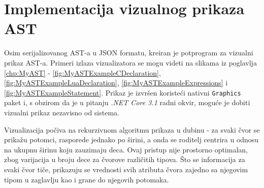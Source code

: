 \section{Implementacija vizualnog prikaza AST}
\label{sec:ImplementationVisualizer}

Osim serijalizovanog AST-a u JSON formatu, kreiran je potprogram za vizualni prikaz AST-a. Primeri izlaza vizualizatora se mogu videti na slikama iz poglavlja \ref{chp:MyAST} - \ref{fig:MyASTExampleCDeclaration}, \ref{fig:MyASTExampleLuaDeclaration}, \ref{fig:MyASTExampleExpressions} i \ref{fig:MyASTExampleStatement}. Prikaz je izvršen koristeći nativni \texttt{Graphics} paket i, s obzirom da je u pitanju \emph{.NET Core 3.1} radni okvir, moguće je dobiti vizualni prikaz nezavisno od sistema.

Vizualizacija počiva na rekurzivnom algoritmu prikaza u dubinu - za svaki čvor se prikažu potomci, rasporede jednako po širini, a onda se roditelj centrira u odnosu na ukupnu širinu koju zauzimaju deca. Ovaj pristup nije prostorno optimalan, zbog varijacija u broju dece za čvorove različitih tipova. Što se informacija za svaki čvor tiče, prikazuju se vrednosti svih atributa čvora zajedno sa njegovim tipom u zaglavlju kao i grane do njegovih potomaka.
